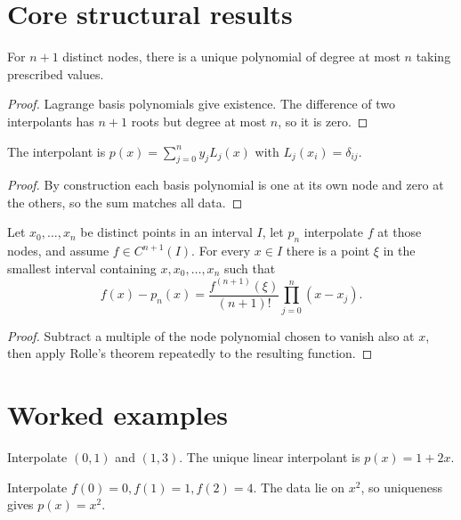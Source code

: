 \section{Core structural results}

\begin{theorem}\label{thm:ii20-01}
For $n+1$ distinct nodes, there is a unique polynomial of degree at most $n$ taking prescribed values.
\begin{proof}
Lagrange basis polynomials give existence. The difference of two interpolants has $n+1$ roots but degree at most $n$, so it is zero.
\end{proof}
\end{theorem}

\begin{theorem}\label{thm:ii20-02}
The interpolant is $p(x)=\sum_{j=0}^ny_jL_j(x)$ with $L_j(x_i)=\delta_{ij}$.
\begin{proof}
By construction each basis polynomial is one at its own node and zero at the others, so the sum matches all data.
\end{proof}
\end{theorem}

\begin{theorem}\label{thm:ii20-03}
Let $x_0,\ldots,x_n$ be distinct points in an interval $I$, let $p_n$ interpolate $f$ at those nodes, and assume $f\in C^{n+1}(I)$. For every $x\in I$ there is a point $\xi$ in the smallest interval containing $x,x_0,\ldots,x_n$ such that
\[
f(x)-p_n(x)=\frac{f^{(n+1)}(\xi)}{(n+1)!}\prod_{j=0}^n(x-x_j).
\]
\begin{proof}
Subtract a multiple of the node polynomial chosen to vanish also at $x$, then apply Rolle's theorem repeatedly to the resulting function.
\end{proof}
\end{theorem}

\section{Worked examples}

\begin{example}\label{ex:ii20-worked-01}
Interpolate $(0,1)$ and $(1,3)$. The unique linear interpolant is $p(x)=1+2x$.
\end{example}

\begin{example}\label{ex:ii20-worked-02}
Interpolate $f(0)=0,f(1)=1,f(2)=4$. The data lie on $x^2$, so uniqueness gives $p(x)=x^2$.
\end{example}

